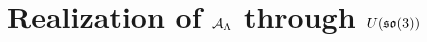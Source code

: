 \section{Realization of $\mathcal A_\Lambda$ through $U(\mathfrak{so}(3))$}

    
            
        
        
    

    
    
    
